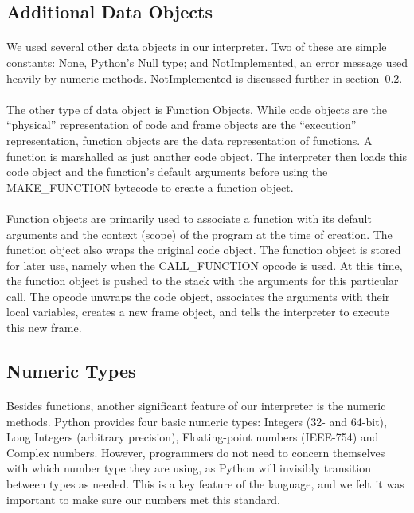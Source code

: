 \documentclass{article}
\begin{document}
\subsection{Additional Data Objects}

\paragraph{}
We used several other data objects in our interpreter. Two of these are simple constants: None, Python's Null type; and NotImplemented, an error message used heavily by numeric methods. NotImplemented is discussed further in section~\ref{numeric}.

\paragraph{}
The other type of data object is Function Objects. While code objects are the ``physical'' representation of code and frame objects are the ``execution'' representation, function objects are the data representation of functions. A function is marshalled as just another code object. The interpreter then loads this code object and the function's default arguments before using the MAKE\_FUNCTION bytecode to create a function object.

\paragraph{}
Function objects are primarily used to associate a function with its default arguments and the context (scope) of the program at the time of creation. The function object also wraps the original code object. The function object is stored for later use, namely when the CALL\_FUNCTION opcode is used. At this time, the function object is pushed to the stack with the arguments for this particular call. The opcode unwraps the code object, associates the arguments with their local variables, creates a new frame object, and tells the interpreter to execute this new frame.

\subsection{Numeric Types} \label{numeric}

\paragraph{}
Besides functions, another significant feature of our interpreter is the numeric methods. Python provides four basic numeric types: Integers (32- and 64-bit), Long Integers (arbitrary precision), Floating-point numbers (IEEE-754) and Complex numbers. However, programmers do not need to concern themselves with which number type they are using, as Python will invisibly transition between types as needed. This is a key feature of the language, and we felt it was important to make sure our numbers met this standard.
\end{document}
